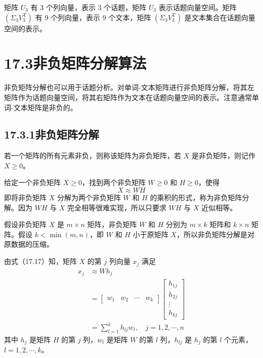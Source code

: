 \documentclass[UTF8, 12pt, fontset=fandol, oneside]{ctexart}
\begin{document}
矩阵 $U_3$ 有 3 个列向量，表示 3 个话题，矩阵 $U_3$ 表示话题向量空间。矩阵 $(\Sigma_3V_3^{\mathrm{T}})$ 有 9 个列向量，表示 9 个文本，矩阵 $(\Sigma_3V_3^{\mathrm{T}})$ 是文本集合在话题向量空间的表示。

\section*{17.3\quad 非负矩阵分解算法}

非负矩阵分解也可以用于话题分析。对单词-文本矩阵进行非负矩阵分解，将其左矩阵作为话题向量空间，将其右矩阵作为文本在话题向量空间的表示。注意通常单词-文本矩阵是非负的。

\subsection*{17.3.1\quad 非负矩阵分解}

若一个矩阵的所有元素非负，则称该矩阵为非负矩阵，若 $X$ 是非负矩阵，则记作 $X\geqslant 0$。

给定一个非负矩阵 $X\geqslant 0$，找到两个非负矩阵 $W\geqslant 0$ 和 $H\geqslant 0$，使得
\begin{equation}
X\approx WH
\tag{17.17}
\end{equation}
即将非负矩阵 $X$ 分解为两个非负矩阵 $W$ 和 $H$ 的乘积的形式，称为非负矩阵分解。因为 $WH$ 与 $X$ 完全相等很难实现，所以只要求 $WH$ 与 $X$ 近似相等。

假设非负矩阵 $X$ 是 $m\times n$ 矩阵，非负矩阵 $W$ 和 $H$ 分别为 $m\times k$ 矩阵和 $k\times n$ 矩阵。假设 $k<\min(m,n)$，即 $W$ 和 $H$ 小于原矩阵 $X$，所以非负矩阵分解是对原数据的压缩。

由式（17.17）知，矩阵 $X$ 的第 $j$ 列向量 $x_j$ 满足
\begin{equation}
\begin{aligned}
x_j&\approx Wh_j\\
&=
\begin{bmatrix}
w_1 & w_2 & \cdots & w_k
\end{bmatrix}
\begin{bmatrix}
h_{1j}\\
h_{2j}\\
\vdots\\
h_{kj}
\end{bmatrix}\\
&=\sum_{l=1}^k h_{lj}w_l,\quad j=1,2,\cdots,n
\end{aligned}
\tag{17.18}
\end{equation}
其中 $h_j$ 是矩阵 $H$ 的第 $j$ 列，$w_l$ 是矩阵 $W$ 的第 $l$ 列，$h_{lj}$ 是 $h_j$ 的第 $l$ 个元素，$l=1,2,\cdots,k$。
\end{document}
